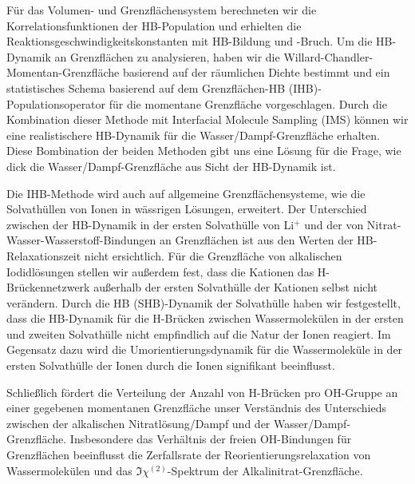 \documentclass[
11pt, %
ngerman,
english, %
singlespacing, %
headsepline, %
]{MastersDoctoralThesis} %
\newcommand{\Li}{Li$^{+}$\xspace}
\begin{document}
{\begin{extraAbstract}
%
Für das Volumen- und Grenzflächensystem berechneten wir die Korrelationsfunktionen der HB-Population und erhielten die Reaktionsgeschwindigkeitskonstanten mit HB-Bildung und -Bruch. Um die HB-Dynamik an Grenzflächen zu analysieren, haben wir die Willard-Chandler-Momentan-Grenzfläche basierend auf der räumlichen Dichte bestimmt und ein statistisches Schema basierend auf dem Grenzflächen-HB (IHB)-Populationsoperator für die momentane Grenzfläche vorgeschlagen. Durch die Kombination dieser Methode mit Interfacial Molecule Sampling (IMS) können wir eine realistischere HB-Dynamik für die Wasser/Dampf-Grenzfläche erhalten. Diese Bombination der beiden Methoden gibt uns eine Lösung für die Frage, wie dick die Wasser/Dampf-Grenzfläche aus Sicht der HB-Dynamik ist.

%
Die IHB-Methode wird auch auf allgemeine Grenzflächensysteme, wie die Solvathüllen von Ionen in wässrigen Lösungen, erweitert. Der Unterschied zwischen der HB-Dynamik in der ersten Solvathülle von \Li und der von Nitrat-Wasser-Wasserstoff-Bindungen an Grenzflächen ist aus den Werten der HB-Relaxationszeit nicht ersichtlich. Für die Grenzfläche von alkalischen Iodidlösungen stellen wir außerdem fest, dass die Kationen das H-Brückennetzwerk außerhalb der ersten Solvathülle der Kationen selbst nicht verändern. Durch die HB (SHB)-Dynamik der Solvathülle haben wir festgestellt, dass die HB-Dynamik für die H-Brücken zwischen Wassermolekülen in der ersten und zweiten Solvathülle nicht empfindlich auf die Natur der Ionen reagiert. Im Gegensatz dazu wird die Umorientierungsdynamik für die Wassermoleküle in der ersten Solvathülle der Ionen durch die Ionen signifikant beeinflusst.

%
Schließlich fördert die Verteilung der Anzahl von H-Brücken pro OH-Gruppe an einer gegebenen momentanen Grenzfläche unser Verständnis des Unterschieds zwischen der alkalischen Nitratlösung/Dampf und der Wasser/Dampf-Grenzfläche. Insbesondere das Verhältnis der freien OH-Bindungen für Grenzflächen beeinflusst die Zerfallsrate der Reorientierungsrelaxation von Wassermolekülen und das $\Im\chi^{(2)}$-Spektrum der Alkalinitrat-Grenzfläche.

\end{extraAbstract}
}
\end{document}
